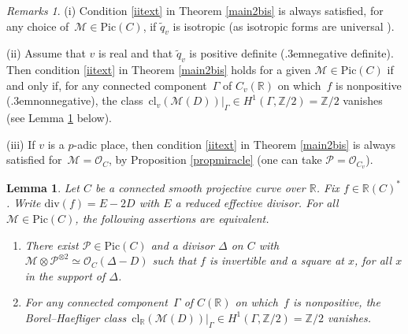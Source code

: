 \documentclass{amsart}
\newtheorem{lem}[thm]{Lemma}
\theoremstyle{definition}
\theoremstyle{remark}
\newtheorem{rems}[thm]{Remarks}
\numberwithin{equation}{section}
\newcommand{\cl}{\mathrm{cl}}
\newcommand{\Pic}{\mathrm{Pic}}
\newcommand{\ddiv}{\mathrm{div}}
\def\resp {\text{resp.}\kern.3em}
\def\Z{\mathbb Z}
\def\R{\mathbb R}
\def\cM{\mathcal{M}}
\def\cO{\mathcal{O}}
\def\cM{\mathcal{M}}
\def\cP{\mathcal{P}}
\def\tq{\tilde{q}}
\begin{document}
\begin{rems}
\label{rem41}
(i)
Condition \ref{iitext} in Theorem \ref{main2bis} is always satisfied, for any choice of~${\cM\in\Pic(C)}$, if $\tq_v$ is isotropic (as isotropic forms are universal \cite[I.3.4]{Lam}). 
 
(ii)
Assume that $v$ is real and that $\tq_v$ is positive definite (\resp negative definite). Then condition  \ref{iitext} in Theorem \ref{main2bis} holds for a given $\cM\in \Pic(C)$ if and only if, for any connected component~$\Gamma$ of $C_v(\R)$ on which~$f$ is nonpositive (\resp nonnegative), the class~$\cl_v(\cM(D))|_{\Gamma}\in H^1(\Gamma,\Z/2)=\Z/2$ vanishes (see Lemma \ref{lemhyp} below).
 
(iii)
If $v$ is a $p$-adic place, then condition \ref{iitext} in Theorem \ref{main2bis} is always satisfied for~$\cM=\cO_{C}$, by Proposition \ref{propmiracle} (one can take $\cP=\cO_{C_v}$).
\end{rems}
 
 \begin{lem}
 \label{lemhyp}
 Let $C$ be a connected smooth projective curve over $\R$. Fix $f\in\R(C)^*$.
 Write $\ddiv(f)=E-2D$ with $E$ a reduced effective divisor. For all $\cM\in \Pic(C)$, the following assertions are equivalent.
 \begin{enumerate}
[label=(\roman*)] 
\item
\label{iR}
There exist $\cP\in\Pic(C)$ and a divisor $\Delta$ on $C$ with ${\cM\otimes\cP^{\otimes 2}\simeq\cO_{C}(\Delta-D)}$ such that $f$ is invertible and a square at $x$, for all $x$ in the support of $\Delta$.
\item
\label{iiR}
For any connected component~$\Gamma$ of $C(\R)$ on which~$f$ is nonpositive, the Borel--Haefliger class~$\cl_{\R}(\cM(D))|_{\Gamma}\in H^1(\Gamma,\Z/2)=\Z/2$ vanishes.
\end{enumerate}
 \end{lem}
 
\end{document}

